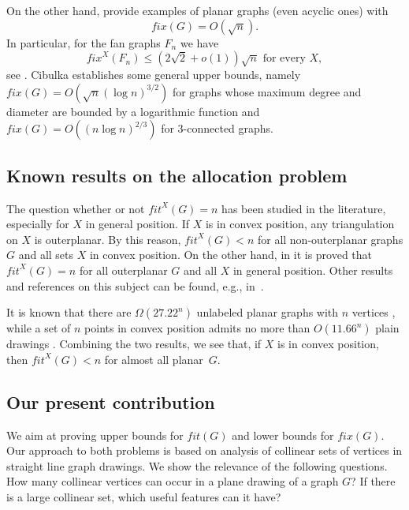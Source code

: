 \documentclass[reqno,12pt]{amsart}
\newcommand{\fix}[1]{\mathit{fix}(#1)}
\newcommand{\fit}[1]{\mathit{fit}(#1)}
\newcommand{\fixx}[1]{\mathit{fix}^X(#1)}
\newcommand{\fitx}[1]{\mathit{fit}^X(#1)}
\begin{document}
On the other hand, \cite{Bose,merged,KPRSV} provide examples of planar
graphs (even acyclic ones) with 
\begin{equation}\label{eq:fixupper}
\fix G=O(\sqrt n).
\end{equation}
In particular, for the fan graphs $F_n$ we have
\begin{equation}\label{eq:fixxFn}
\fixx{F_n}\le(2\sqrt2+o(1))\sqrt n\text{\ \ for\ every\ }X,
\end{equation}
see \cite{KPRSV}.
Cibulka \cite{Cib} establishes some general upper bounds, namely $\fix G=O(\sqrt n(\log n)^{3/2})$
for graphs whose maximum degree and diameter are bounded by a logarithmic function and
$\fix{G}=O((n\log n)^{2/3})$ for 3-connected graphs.


\subsection{Known results on the allocation problem}

The question whether or not $\fitx G=n$ has been studied in the literature,
especially for $X$ in general position.
If $X$ is in convex position, any triangulation on $X$ is outerplanar.
By this reason, $\fitx G<n$ for all non-outerplanar graphs $G$ and all
sets $X$ in convex position.
On the other hand, in \cite{GritzmannMPP91} it is proved that
$\fitx G=n$ for all outerplanar $G$ and all $X$ in general position.
Other results and references on this subject can be found, e.g., in~\cite{GarciaHHTV09}.

It is known that there are $\Omega(27.22^n)$
unlabeled planar graphs with $n$ vertices \cite{GimenezN09}, while a set of $n$ points in convex position
admits no more than $O(11.66^n)$ plain drawings \cite{FlajoletN99}. Combining the two results, we see
that, if $X$ is in convex position, then $\fitx G<n$ for almost all planar~$G$.



\subsection{Our present contribution}


We aim at proving upper bounds for $\fit G$ and lower bounds for $\fix G$.
Our approach to both problems is based on analysis of collinear sets of vertices
in straight line graph drawings. We show the relevance of the following questions.
How many collinear vertices can occur in a plane drawing of a graph $G$?
If there is a large collinear set, which useful features can it have?
\end{document}
